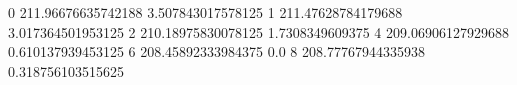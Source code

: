 0 211.96676635742188 3.507843017578125
1 211.47628784179688 3.017364501953125
2 210.18975830078125 1.7308349609375
4 209.06906127929688 0.610137939453125
6 208.45892333984375 0.0
8 208.77767944335938 0.318756103515625
